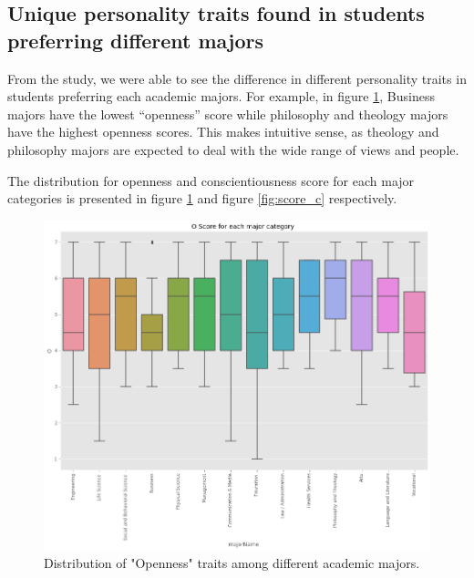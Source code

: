 \documentclass[conference]{IEEEtran}
\begin{document}
\subsection{Unique personality traits found in students preferring different majors}\label{subsec4}
From the study, we were able to see the difference in different personality traits
in students preferring each academic majors. For example, in figure \ref{fig:score_o}, Business
majors have the lowest “openness” score while philosophy and theology majors have
the highest openness scores. This makes intuitive sense, as theology and philosophy
majors are expected to deal with the wide range of views and people. 




  The distribution for openness and conscientiousness score for each major categories is presented in figure \ref{fig:score_o} and figure \ref{fig:score_c} respectively.

\begin{figure}[h]
\includegraphics[scale=0.25]{figs/score_o.png}
\caption{Distribution of "Openness" traits among different academic majors.}
\label{fig:score_o}
\centering
\end{figure}
\end{document}
